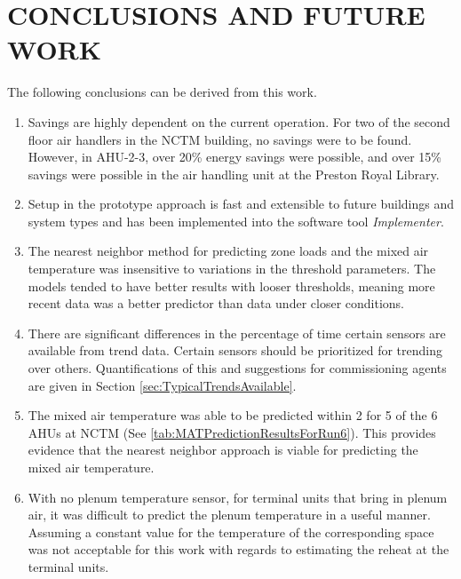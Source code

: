\chapter{\texorpdfstring{\MakeUppercase{Conclusions and Future Work}}{Conclusions and Future Work}}

The following conclusions can be derived from this work.

\begin{enumerate}
    \item Savings are highly dependent on the current operation. For two
        of the second floor air handlers in the NCTM building, no
        savings were to be found. However, in AHU-2-3, over 20\% energy
        savings were possible, and over 15\% savings were possible in
        the air handling unit at the Preston Royal Library. 
    \item Setup in the prototype approach is fast and extensible to
        future buildings and system types and has been implemented into
        the software tool \textit{Implementer}.
    \item The nearest neighbor method for predicting zone loads and     
        the mixed air temperature was insensitive to variations in the      
        threshold parameters. The models tended to have better results with 
        looser thresholds, meaning more recent data was a better predictor  
        than data under closer conditions.                                  
    \item There are significant differences in the percentage of time   
        certain sensors are available from trend data. Certain sensors      
        should be prioritized for trending over others. Quantifications of  
        this and suggestions for commissioning agents are given in Section  
        \ref{sec:TypicalTrendsAvailable}.                                   
    \item The mixed air temperature was able to be predicted within
        \SI{2}{\degF} for 5 of the 6 AHUs at NCTM (See \tableref{}
        \ref{tab:MATPredictionResultsForRun6}). This provides evidence
        that the nearest neighbor approach is viable for predicting the
        mixed air temperature.
    \item With no plenum temperature sensor, for terminal units that
        bring in plenum air, it was difficult to predict the plenum
        temperature in a useful manner. Assuming a constant value for the
        temperature of the corresponding space was not acceptable for
        this work with regards to estimating the reheat at the terminal units.

\end{enumerate}
